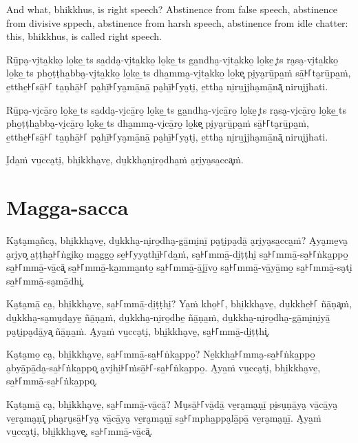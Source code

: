 And what, bhikkhus, is right speech? Abstinence from false speech, abstinence
from divisive sppech, abstinence from harsh speech, abstinence from idle
chatter: this, bhikkhus, is called right speech.

\paliPage

Rū̱pa̮-vi̮ta̱kko̱ lo̱ke̱ \ldo̱ts{} sa̱dda̮-vi̮ta̱kko̱ lo̱ke̱ \ldo̱ts{} ga̱ndha̮-vi̮ta̱kko̱ lo̱ke̱ \ldo͓ts{}
ra̮sa̮-vi̮ta̱kko̱ lo̱ke̱ \ldo̱ts{} pho̱ṭṭha̱bba̮-vi̮ta̱kko̱ lo̱ke̱ \ldo̱ts{} dha̱mma̮-vi̮ta̱kko̱ lo̱ke͓
pi̮ya̮rū̱pa̱ṁ sā̱꜔꜒ta̮rū̱pa̱ṁ, e̱tthe̱꜔꜒sā̱꜔꜒ ta̱ṇhā̱꜔꜒ pa̮hī̱꜔꜒ya̮mā̱nā̱ pa̮hī̱꜔꜒ya̮ti̮, e̱ttha̮ ni̮ru̱jjha̮mā̱nā͓
nirujjhati.

Rū̱pa̮-vi̮cā̱ro̱ lo̱ke̱ \ldo̱ts{} sa̱dda̮-vi̮cā̱ro̱ lo̱ke̱ \ldo̱ts{} ga̱ndha̮-vi̮cā̱ro̱ lo̱ke̱ \ldo͓ts{}
ra̮sa̮-vi̮cā̱ro̱ lo̱ke̱ \ldo̱ts{} pho̱ṭṭha̱bba̮-vi̮cā̱ro̱ lo̱ke̱ \ldo̱ts{} dha̱mma̮-vi̮cā̱ro̱ lo̱ke͓
pi̮ya̮rū̱pa̱ṁ sā̱꜔꜒ta̮rū̱pa̱ṁ, e̱tthe̱꜔꜒sā̱꜔꜒ ta̱ṇhā̱꜔꜒ pa̮hī̱꜔꜒ya̮mā̱nā̱ pa̮hī̱꜔꜒ya̮ti̮, e̱ttha̮ ni̮ru̱jjha̮mā̱nā͓
nirujjhati.

I̮da̱ṁ vu̱cca̮ti̮, bhi̱kkha̮ve̱, du̱kkha̮ni̮ro̱dha̱ṁ a̮ri̮ya̮sa̱cca͓ṁ.

\section*{Magga-sacca}

Ka̮ta̮ma̱ñca̮, bhi̱kkha̮ve̱, du̱kkha̮-ni̮ro̱dha̮-gā̱mi̮nī̱ pa̮ṭi̮pa̮dā̱ a̮ri̮ya̮sa̱cca̱ṁ? A̮ya̮me̱va̮ a̮ri̮yo͓
a̱ṭṭha̱꜔꜒ṅgi̮ko̱ ma̱ggo̱ se̱꜔꜒yya̮thī̱꜔꜒da̱ṁ, sa̱꜔꜒mmā̱-di̱ṭṭhi̮ sa̱꜔꜒mmā̱-sa̱꜔꜒ṅka̱ppo̱ sa̱꜔꜒mmā̱-vā̱cā͓
sa̱꜔꜒mmā̱-ka̱mma̱nto̱ sa̱꜔꜒mmā̱-ā̱jī̱vo̱ sa̱꜔꜒mmā̱-vā̱yā̱mo̱ sa̱꜔꜒mmā̱-sa̮ti̮ sa̱꜔꜒mmā̱-sa̮mā̱dhi͓.

Ka̮ta̮mā̱ ca̮, bhi̱kkha̮ve̱, sa̱꜔꜒mmā̱-di̱ṭṭhi̮? Ya̱ṁ kho̱꜔꜒, bhi̱kkha̮ve̱, du̱kkhe̱꜔꜒ ñā̱ṇa͓ṁ,
du̱kkha̮-sa̮mu̮da̮ye̱ ñā̱ṇa̱ṁ, du̱kkha̮-ni̮ro̱dhe̱ ñā̱ṇa̱ṁ, du̱kkha̮-ni̮ro̱dha̮-gā̱mi̮ni̮yā̱ pa̮ṭi̮pa̮dā̱ya͓
ñā̱ṇa̱ṁ. A̮ya̱ṁ vu̱cca̮ti̮, bhi̱kkha̮ve̱, sa̱꜔꜒mmā̱-di̱ṭṭhi͓.

Ka̮ta̮mo̱ ca̮, bhi̱kkha̮ve̱, sa̱꜔꜒mmā̱-sa̱꜔꜒ṅka̱ppo̱? Ne̱kkha̱꜔꜒mma̮-sa̱꜔꜒ṅka̱ppo̱ a̮byā̱pā̱da̮-sa̱꜔꜒ṅka̱ppo͓
a̮vi̮hi̱꜔꜒ṁsā̱꜔꜒-sa̱꜔꜒ṅka̱ppo̱. A̮ya̱ṁ vu̱cca̮ti̮, bhi̱kkha̮ve̱, sa̱꜔꜒mmā̱-sa̱꜔꜒ṅka̱ppo͓.

Ka̮ta̮mā̱ ca̮, bhi̱kkha̮ve̱, sa̱꜔꜒mmā̱-vā̱cā̱? Mu̮sā̱꜔꜒vā̱dā̱ ve̱ra̮ma̮ṇī̱ pi̮su̮ṇā̱ya̮ vā̱cā̱ya̮ ve̱ra̮ma̮ṇī͓
pha̮ru̮sā̱꜔꜒ya̮ vā̱cā̱ya̮ ve̱ra̮ma̮ṇī̱ sa̱꜔꜒mpha̱ppa̮lā̱pā̱ ve̱ra̮ma̮ṇī̱. A̮ya̱ṁ vu̱cca̮ti̮, bhi̱kkha̮ve͓,
sa̱꜔꜒mmā̱-vā̱cā͓.

\englishPage

